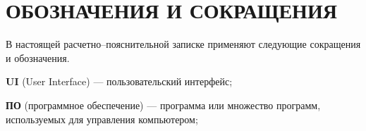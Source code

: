 \section*{ОБОЗНАЧЕНИЯ И СОКРАЩЕНИЯ}

В настоящей расчетно--пояснительной записке применяют следующие сокращения и обозначения.

\textbf{UI} (User Interface)  --- пользовательский интерфейс;

\textbf{ПО} (программное обеспечение) --- программа или множество программ, используемых для управления компьютером;


\pagebreak